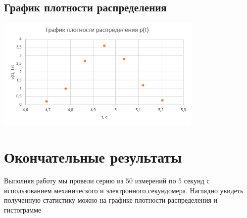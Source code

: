 \documentclass[12pt,a4paper]{article}
\begin{document}
\subsection{График плотности распределения}
\begin{center}
    \includegraphics[width=10cm]{graph.png}
\end{center}
\section{Окончательные результаты}
Выполняя работу мы провели серию из 50 измерений по 5 секунд с использованием механического и электронного секундомера. Наглядно увидеть полученную статистику можно на графике плотности распределения и гистограмме
\end{document}
